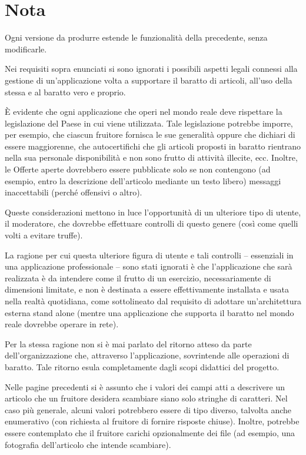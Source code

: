 \section{Nota}
Ogni versione da produrre estende le funzionalità della precedente, senza modificarle.\newline

Nei requisiti sopra enunciati si sono ignorati i possibili aspetti legali connessi alla gestione di un’applicazione volta a supportare il baratto di articoli, all’uso della stessa e al baratto vero e proprio. 

È evidente che ogni applicazione che operi nel mondo reale deve rispettare la legislazione del Paese in cui viene utilizzata. Tale legislazione potrebbe imporre, per esempio, che ciascun fruitore fornisca le sue generalità oppure che dichiari di essere maggiorenne, che autocertifichi che gli articoli proposti in baratto rientrano nella sua personale disponibilità e non sono frutto di attività illecite, ecc. 
Inoltre, le Offerte aperte dovrebbero essere pubblicate solo se non contengono (ad esempio, entro la descrizione dell’articolo mediante un testo libero) messaggi inaccettabili (perché offensivi o altro). 

Queste considerazioni mettono in luce l’opportunità di un ulteriore tipo di utente, il moderatore, che dovrebbe effettuare controlli di questo genere (così come quelli volti a evitare truffe). 

La ragione per cui questa ulteriore figura di utente e tali controlli – essenziali in una applicazione professionale – sono stati ignorati è che l’applicazione che sarà realizzata è da intendere come il frutto di un esercizio, necessariamente di dimensioni limitate, e non è destinata a essere effettivamente installata e usata nella realtà quotidiana, come sottolineato dal requisito di adottare un’architettura esterna stand alone (mentre una applicazione che supporta il baratto nel mondo reale dovrebbe operare in rete). \newline

Per la stessa ragione non si è mai parlato del ritorno atteso da parte dell’organizzazione che, attraverso l’applicazione, sovrintende alle operazioni di baratto. Tale ritorno esula completamente dagli scopi didattici del progetto.\newline

Nelle pagine precedenti si è assunto che i valori dei campi atti a descrivere un articolo che un fruitore desidera scambiare siano solo stringhe di caratteri. 
Nel caso più generale, alcuni valori potrebbero essere di tipo diverso, talvolta anche enumerativo (con richiesta al fruitore di fornire risposte chiuse). Inoltre, potrebbe essere contemplato che il fruitore carichi opzionalmente dei file (ad esempio, una fotografia dell’articolo che intende scambiare). 

